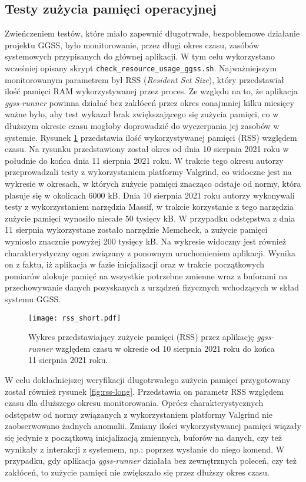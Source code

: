 \subsection{Testy zużycia pamięci operacyjnej}

Zwieńczeniem testów, które miało zapewnić długotrwałe, bezpoblemowe działanie projektu GGSS, było monitorowanie, przez długi okres czasu, zasóbów systemowych przypisanych do głównej aplikacji. W tym celu wykorzystano wcześniej opisany skrypt \lstinline{check_resource_usage_ggss.sh}. Najważniejszym monitorowanym parametrem był RSS (\emph{Resident Set Size}), który przedstawiał ilość pamięci RAM wykorzystywanej przez proces. Ze względu na to, że aplikacja \emph{ggss-runner} powinna działać bez zakłóceń przez okres conajmniej kilku miesięcy ważne było, aby test wykazał brak zwiększającego się zużycia pamięci, co w dłuższym okresie czasu mogłoby doprowadzić do wyczerpania jej zasobów w systemie.
Rysunek \ref{fig:rss-short} przedstawia ilość wykorzystywanej pamięci (RSS) względem czasu. Na rysunku przedstawiony został okres od dnia 10 sierpnia 2021 roku w południe do końca dnia 11 sierpnia 2021 roku. W trakcie tego okresu autorzy przeprowadzali testy z wykorzystaniem platformy Valgrind, co widoczne jest na wykresie w okresach, w których zużycie pamięci znacząco odstaje od normy, która plasuje się w okolicach 6000 kB. Dnia 10 sierpnia 2021 roku autorzy wykonywali testy z wykorzystaniem narzędzia Massif, w trakcie korzystanie z tego narzędzia zużycie pamięci wynosiło niecałe 50 tysięcy kB. W przypadku odstępstwa z dnia 11 sierpnia wykorzystane zostało narzędzie Memcheck, a zużycie pamięci wyniosło znacznie powyżej 200 tysięcy kB. Na wykresie widoczny jest również charakterystyczny ogon związany z ponownym uruchomieniem aplikacji. Wynika on z faktu, iż aplikacja w fazie inicjalizacji oraz w trakcie początkowych pomiarów alokuje pamięć na wszystkie potrzebne zmienne wraz z buforami na przechowywanie danych pozyskanych z urządzeń fizycznych wchodzących w skład systemu GGSS.

\begin{figure}[H]
    \centering
    \texttt{[image: rss\_short.pdf]}
    \caption{Wykres przedstawiający zużycie pamięci (RSS) przez aplikację \emph{ggss-runner} względem czasu w okresie od 10 sierpnia 2021 roku do końca 11 sierpnia 2021 roku.}
    \label{fig:rss-short}
\end{figure}

W celu dokładniejszej weryfikacji długotrwałego zużycia pamięci przygotowany został również rysunek \ref{fig:rss-long}. Przedstawia on parametr RSS względem czasu dla dłuższego okresu monitorowania. Oprócz charakterystycznych odstępstw od normy związanych z wykorzystaniem platformy Valgrind nie zaobserwowano żadnych anomalii. Zmiany ilości wykorzystywanej pamięci wiązały się jedynie z początkową inicjalizacją zmiennych, buforów na danych, czy też wynikały z interakcji z systemem, np.: poprzez wysłanie do niego komend. W przypadku, gdy aplikacja \emph{ggss-runner} działała bez zewnętrznych poleceń, czy też zakłóceń, to zużycie pamięci nie zwiększało się przez dłuższy okres czasu.

